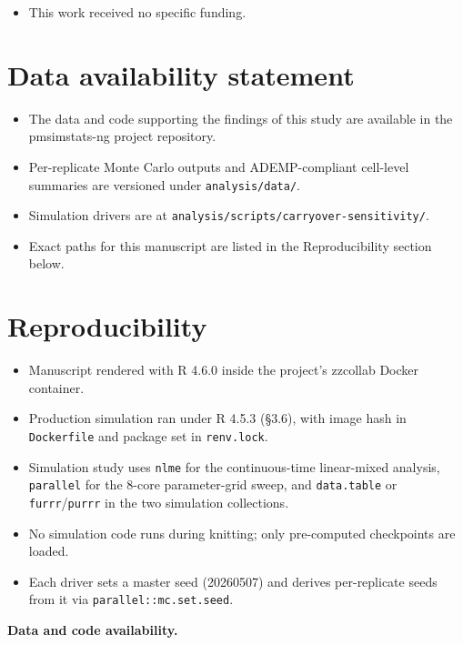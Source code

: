 \documentclass[
  11pt,
]{article}
\providecommand{\tightlist}{%
  \setlength{\itemsep}{0pt}\setlength{\parskip}{0pt}}
\begin{document}
\begin{itemize}
\tightlist
\item
  This work received no specific funding.
\end{itemize}

\section{Data availability statement}\label{data-availability-statement}

\begin{itemize}
\tightlist
\item
  The data and code supporting the findings of this study are
  available in the pmsimstats-ng project repository.
\item
  Per-replicate Monte Carlo outputs and ADEMP-compliant cell-level
  summaries are versioned under \texttt{analysis/data/}.
\item
  Simulation drivers are at \texttt{analysis/scripts/carryover-sensitivity/}.
\item
  Exact paths for this manuscript are listed in the Reproducibility
  section below.
\end{itemize}

\section{Reproducibility}\label{reproducibility}

\begin{itemize}
\tightlist
\item
  Manuscript rendered with R 4.6.0 inside the project's zzcollab
  Docker container.
\item
  Production simulation ran under R 4.5.3 (\S3.6), with image hash in
  \texttt{Dockerfile} and package set in \texttt{renv.lock}.
\item
  Simulation study uses \texttt{nlme} for the continuous-time linear-mixed
  analysis, \texttt{parallel} for the 8-core parameter-grid sweep, and
  \texttt{data.table} or \texttt{furrr}/\texttt{purrr} in the two simulation collections.
\item
  No simulation code runs during knitting; only pre-computed
  checkpoints are loaded.
\item
  Each driver sets a master seed (20260507) and derives per-replicate
  seeds from it via \texttt{parallel::mc.set.seed}.
\end{itemize}

\textbf{Data and code availability.}
\end{document}
